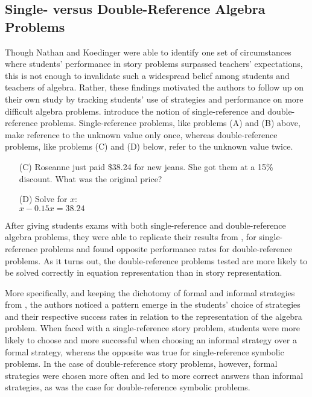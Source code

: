 \documentclass[10pt,letterpaper]{article}
\begin{document}
\subsection{Single- versus Double-Reference Algebra Problems}

Though Nathan and Koedinger were able to identify one set of circumstances where students' performance in story problems surpassed teachers' expectations, this is not enough to invalidate such a widespread belief among students and teachers of algebra. Rather, these findings motivated the authors to follow up on their own study by tracking students' use of strategies and performance on more difficult algebra problems.  introduce the notion of single-reference and double-reference problems. Single-reference problems, like problems (A) and (B) above, make reference to the unknown value only once, whereas double-reference problems, like problems (C) and (D) below, refer to the unknown value twice.

\begin{enumerate}
	\item[(C)] Roseanne just paid \$38.24 for new jeans. She got them at a 15\% discount. What was the original price?
	
	\item[(D)] Solve for $x$:\\$x - 0.15x = 38.24$
\end{enumerate}

After giving students exams with both single-reference and double-reference algebra problems, they were able to replicate their results from \cite{KoedNath2004}, for single-reference problems and found opposite performance rates for double-reference problems. As it turns out, the double-reference problems  tested are more likely to be solved correctly in equation representation than in story representation. 

More specifically, and keeping the dichotomy of formal and informal strategies from , the authors noticed a pattern emerge in the students' choice of strategies and their respective success rates in relation to the representation of the algebra problem. When faced with a single-reference story problem, students were more likely to choose and more successful when choosing an informal strategy over a formal strategy, whereas the opposite was true for single-reference symbolic problems. In the case of double-reference story problems, however, formal strategies were chosen more often and led to more correct answers than informal strategies, as was the case for double-reference symbolic problems. 
\end{document}
